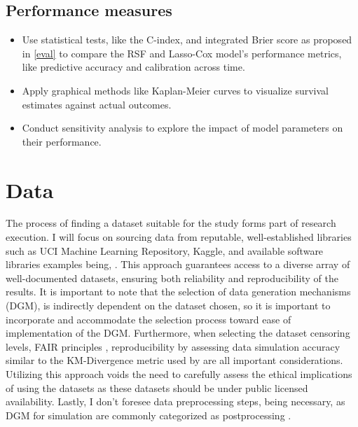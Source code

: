 \subsection{Performance measures}
\begin{itemize}
\item Use statistical tests, like the C-index, and integrated Brier score as proposed in \ref{eval} to compare the RSF and Lasso-Cox model's performance metrics, like predictive accuracy and calibration across time.
\item Apply graphical methods like Kaplan-Meier curves to visualize survival estimates against actual outcomes.
\item Conduct sensitivity analysis to explore the impact of model parameters on their performance.
\end{itemize}

\section{Data}
\noindent The process of finding a dataset suitable for the study forms part of research execution. I will focus on sourcing data from reputable, well-established libraries such as UCI Machine Learning Repository, Kaggle, and available software libraries examples being, \parencite{nagpal_auton-survival_2022} \parencite{davidson-pilon_lifelines_2024} \parencite{sebastian_polsterl_scikit-survival_2023}. This approach guarantees access to a diverse array of well-documented datasets, ensuring both reliability and reproducibility of the results. It is important to note that the selection of data generation mechanisms (DGM), is indirectly dependent on the dataset chosen, so it is important to incorporate and accommodate the selection process toward ease of implementation of the DGM. Furthermore, when selecting the dataset censoring levels, FAIR principles \parencite{wilkinson_fair_2016}, reproducibility by assessing data simulation accuracy similar to the KM-Divergence metric used by \parencite{norcliffe_survivalgan_2023} are all important considerations. Utilizing this approach voids the need to carefully assess the ethical implications of using the datasets as these datasets should be under public licensed availability. Lastly, I don't foresee data preprocessing steps, being necessary, as DGM for simulation are commonly categorized as postprocessing \parencite{jin_imputation_2024}. 

